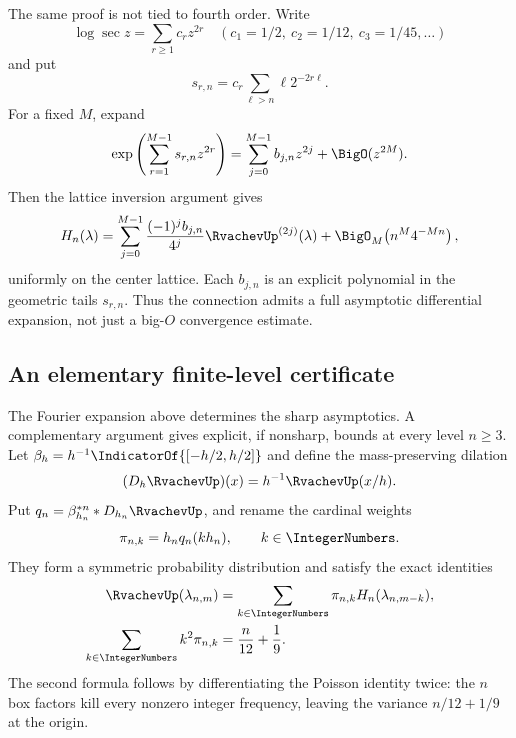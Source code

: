 \documentclass[11pt,oneside]{article}
\theoremstyle{definition}
\theoremstyle{remark}
\begin{document}
The same proof is not tied to fourth order.  Write
\begin{equation}
 \log\sec z=\sum_{r\ge1}c_rz^{2r}
 \quad(c_1=1/2,\ c_2=1/12,\ c_3=1/45,\ldots)              \label{tmrates:eq:logsec-full}
\end{equation}
and put
\begin{equation}
 s_{r,n}=c_r\sum_{\ell>n}\ell2^{-2r\ell}.                 \label{tmrates:eq:srn}
\end{equation}
For a fixed $M$, expand
\begin{equation}
 \exp\left(\sum_{r=1}^{M-1}s_{r,n}z^{2r}\right)
 =\sum_{j=0}^{M-1}b_{j,n}z^{2j}+\BigO(z^{2M}).             \label{tmrates:eq:bjn}
\end{equation}
Then the lattice inversion argument gives
\begin{equation}
 H_n(\lambda)
 =\sum_{j=0}^{M-1}\frac{(-1)^j b_{j,n}}{4^j}
    \RvachevUp^{(2j)}(\lambda)
 +\BigO_M\!\left(n^M4^{-Mn}\right),                      \label{tmrates:eq:all-orders}
\end{equation}
uniformly on the center lattice.  Each $b_{j,n}$ is an explicit polynomial in the geometric
tails $s_{r,n}$.  Thus the connection admits a full asymptotic differential expansion, not
just a big-$O$ convergence estimate.

\subsection{An elementary finite-level certificate}
\label{tmrates:sec:effective-certificate}

The Fourier expansion above determines the sharp asymptotics.  A complementary argument
gives explicit, if nonsharp, bounds at every level $n\ge3$.  Let
$\beta_h=h^{-1}\IndicatorOf{[-h/2,h/2]}$ and define the mass-preserving dilation
\[
 (D_h\RvachevUp)(x)=h^{-1}\RvachevUp(x/h).
\]
Put \(q_n=\beta_{h_n}^{*n}*D_{h_n}\RvachevUp\), and rename the cardinal weights
\begin{equation}
 \pi_{n,k}=h_nq_n(kh_n),\qquad k\in\IntegerNumbers.
 \label{tmrates:eq:cardinal-weights}
\end{equation}
They form a symmetric probability distribution and satisfy the exact identities
\begin{align}
 \RvachevUp(\lambda_{n,m})
 &=\sum_{k\in\IntegerNumbers}\pi_{n,k}H_n(\lambda_{n,m-k}),
 \label{tmrates:eq:cardinal-average}\\
 \sum_{k\in\IntegerNumbers}k^2\pi_{n,k}&=\frac n{12}+\frac19.
 \label{tmrates:eq:cardinal-second-moment}
\end{align}
The second formula follows by differentiating the Poisson identity twice: the
$n$ box factors kill every nonzero integer frequency, leaving the variance
$n/12+1/9$ at the origin.
\end{document}

